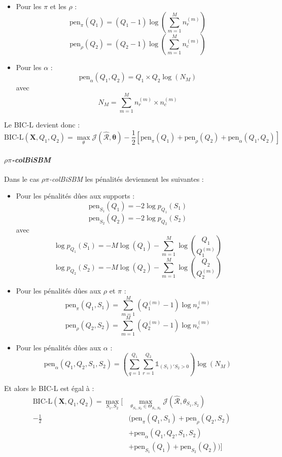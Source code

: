 \documentclass[12pt,a4paper]{rapport1}
\begin{document}
\begin{itemize}
    \item Pour les $\pi$ et les $\rho$ :
    \[\text{pen}_{\pi}(Q_1) = (Q_1 - 1)\log(\sum_{m=1}^{M}n_{r}^{(m)})\]
    \[\text{pen}_{\rho}(Q_2) = (Q_2 - 1)\log(\sum_{m=1}^{M}n_{c}^{(m)})\]
    \item Pour les $\alpha$ :
    \[\text{pen}_{\alpha}(Q_1, Q_2) = Q_1 \times Q_2 \log(N_M)\]
    avec
    \[ N_M = \sum_{m = 1}^{M} n_{r}^{(m)} \times n_{c}^{(m)} \]
\end{itemize}
Le BIC-L devient donc :
\[ \text{BIC-L}(\bm{X},Q_1, Q_2) = \max_{\theta} \mathcal{J} (\mathcal{\hat{R}}, \bm{\theta}) 
- \frac{1}{2} [\text{pen}_{\pi}(Q_1) + \text{pen}_{\rho}(Q_2) + \text{pen}_{\alpha}(Q_1, Q_2)]\]

\paragraph*{\textit{$\rho\pi$-colBiSBM}}
Dans le cas \textit{$\rho\pi$-colBiSBM} les pénalités deviennent les suivantes :

\begin{itemize}
    \item Pour les pénalités dûes aux supports :
    \[ \text{pen}_{S_1}(Q_1) = -2 \log p_{Q_1} (S_1) \]
    \[ \text{pen}_{S_2}(Q_2) = -2 \log p_{Q_2} (S_2) \]
    avec
    \[ \log p_{Q_1}(S_1) = - M \log(Q_1) - \sum_{m=1}^{M} \log {Q_1 \choose Q_1^{(m)}} \]
    \[ \log p_{Q_2}(S_2) = - M \log(Q_2) - \sum_{m=1}^{M} \log {Q_2 \choose Q_2^{(m)}} \]
    \item Pour les pénalités dûes aux $\rho$ et $\pi$ :
    \[ \text{pen}_{\pi}(Q_1, S_1) = \sum_{m=1}^{M} (Q_{1}^{(m)} - 1) \log n_{r}^{(m)} \]
    \[ \text{pen}_{\rho}(Q_2, S_2) = \sum_{m=1}^{M} (Q_{2}^{(m)} - 1) \log n_{c}^{(m)} \]
    \item Pour les pénalités dûes aux $\alpha$ :
    \[ \text{pen}_{\alpha}(Q_1, Q_2, S_1, S_2) = (\sum_{q=1}^{Q_1} \sum_{r=1}^{Q_2} \mathbb{1}_{(S_1)'S_2 > 0}) \log (N_M) \]
\end{itemize}
Et alors le BIC-L est égal à :
\[
    \begin{aligned}
        \text{BIC-L}(\bm{X},Q_1, Q_2) = 
        \max_{S_1,S_2} [
            & \max_{\theta_{S_1,S_2} \in \Theta_{S_1,S_2}} \mathcal{J}(\mathcal{\hat{R}},\theta_{S_1,S_2})\\
            - \frac{1}{2} & (\text{pen}_{\pi}(Q_1, S_1)  + \text{pen}_{\rho}(Q_2, S_2)\\
            &+ \text{pen}_{\alpha}(Q_1, Q_2, S_1, S_2)\\
            &+ \text{pen}_{S_1}(Q_1) + \text{pen}_{S_2}(Q_2))]\\
    \end{aligned}
\]
\end{document}
